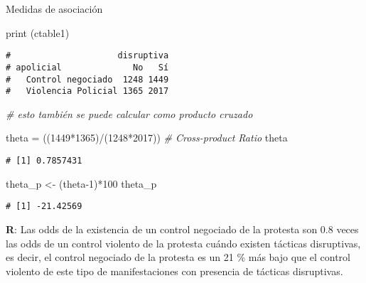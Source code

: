 \documentclass[
  8pt,
  ignorenonframetext,
]{beamer}
\newenvironment{Shaded}{\begin{snugshade}}{\end{snugshade}}
\newcommand{\CommentTok}[1]{\textcolor[rgb]{0.56,0.35,0.01}{\textit{#1}}}
\newcommand{\DecValTok}[1]{\textcolor[rgb]{0.00,0.00,0.81}{#1}}
\newcommand{\FunctionTok}[1]{\textcolor[rgb]{0.00,0.00,0.00}{#1}}
\newcommand{\NormalTok}[1]{#1}
\newcommand{\OtherTok}[1]{\textcolor[rgb]{0.56,0.35,0.01}{#1}}
\newcommand{\SpecialCharTok}[1]{\textcolor[rgb]{0.00,0.00,0.00}{#1}}
\begin{document}
\begin{frame}[fragile]{Medidas de asociación}
\protect\hypertarget{medidas-de-asociaciuxf3n-9}{}
\begin{Shaded}
\begin{Highlighting}[]
\FunctionTok{print}\NormalTok{ (ctable1)}
\end{Highlighting}
\end{Shaded}

\begin{verbatim}
#                     disruptiva
# apolicial              No   Sí
#   Control negociado  1248 1449
#   Violencia Policial 1365 2017
\end{verbatim}

\begin{Shaded}
\begin{Highlighting}[]
\CommentTok{\# esto también se puede calcular como producto cruzado }

\NormalTok{theta }\OtherTok{=}\NormalTok{ ((}\DecValTok{1449}\SpecialCharTok{*}\DecValTok{1365}\NormalTok{)}\SpecialCharTok{/}\NormalTok{(}\DecValTok{1248}\SpecialCharTok{*}\DecValTok{2017}\NormalTok{)) }\CommentTok{\# Cross{-}product Ratio}
\NormalTok{theta}
\end{Highlighting}
\end{Shaded}

\begin{verbatim}
# [1] 0.7857431
\end{verbatim}

\begin{Shaded}
\begin{Highlighting}[]
\NormalTok{theta\_p }\OtherTok{\textless{}{-}}\NormalTok{ (theta}\DecValTok{{-}1}\NormalTok{)}\SpecialCharTok{*}\DecValTok{100}
\NormalTok{theta\_p}
\end{Highlighting}
\end{Shaded}

\begin{verbatim}
# [1] -21.42569
\end{verbatim}

\textbf{R}: Las odds de la existencia de un control negociado de la
protesta son 0.8 veces las odds de un control violento de la protesta
cuándo existen tácticas disruptivas, es decir, el control negociado de
la protesta es un 21 \% más bajo que el control violento de este tipo de
manifestaciones con presencia de tácticas disruptivas.
\end{frame}
\end{document}
